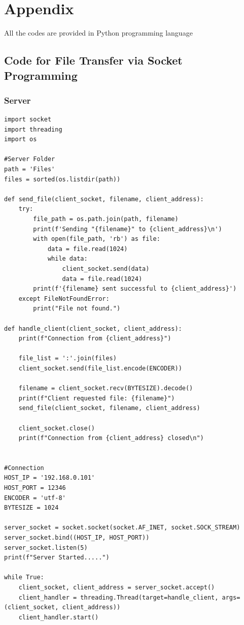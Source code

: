 \documentclass[11pt]{article}
\begin{document}
\newpage
\section*{Appendix}

All the codes are provided in Python programming language

\subsection*{Code for File Transfer via Socket Programming}
\subsubsection*{Server}
\begin{verbatim}
import socket
import threading
import os

#Server Folder
path = 'Files'
files = sorted(os.listdir(path))

def send_file(client_socket, filename, client_address):
    try:
        file_path = os.path.join(path, filename)
        print(f'Sending "{filename}" to {client_address}\n')
        with open(file_path, 'rb') as file:
            data = file.read(1024)
            while data:
                client_socket.send(data)
                data = file.read(1024)
        print(f'{filename} sent successful to {client_address}')
    except FileNotFoundError:
        print("File not found.")

def handle_client(client_socket, client_address):
    print(f"Connection from {client_address}")

    file_list = ':'.join(files)
    client_socket.send(file_list.encode(ENCODER))

    filename = client_socket.recv(BYTESIZE).decode()
    print(f"Client requested file: {filename}")
    send_file(client_socket, filename, client_address)

    client_socket.close()
    print(f"Connection from {client_address} closed\n")


#Connection
HOST_IP = '192.168.0.101'
HOST_PORT = 12346
ENCODER = 'utf-8'
BYTESIZE = 1024

server_socket = socket.socket(socket.AF_INET, socket.SOCK_STREAM)
server_socket.bind((HOST_IP, HOST_PORT))
server_socket.listen(5)
print(f"Server Started.....")

while True:
    client_socket, client_address = server_socket.accept()
    client_handler = threading.Thread(target=handle_client, args=(client_socket, client_address))
    client_handler.start()
\end{verbatim}
\end{document}
